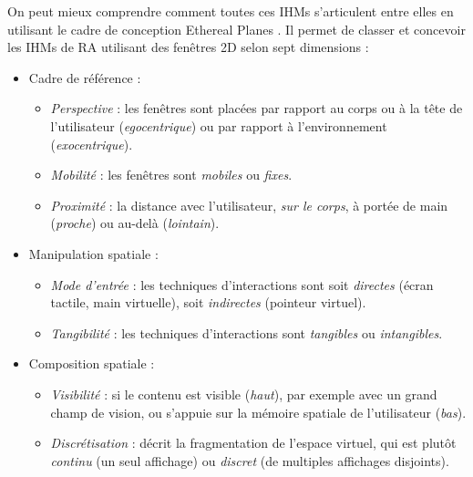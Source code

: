 On peut mieux comprendre comment toutes ces IHMs s'articulent entre elles en utilisant le cadre de conception Ethereal Planes \citep{Ens2014a}. Il permet de classer et concevoir les IHMs de RA utilisant des fenêtres 2D selon sept dimensions :
\begin{itemize}
  \item Cadre de référence :
  \begin{itemize}
    \item \emph{Perspective} : les fenêtres sont placées par rapport au corps ou à la tête de l'utilisateur (\emph{egocentrique}) ou par rapport à l'environnement (\emph{exocentrique}).
    \item \emph{Mobilité} : les fenêtres sont \emph{mobiles} ou \emph{fixes}.
    \item \emph{Proximité} : la distance avec l'utilisateur, \emph{sur le corps}, à portée de main (\emph{proche}) ou au-delà (\emph{lointain}).
  \end{itemize}
\end{itemize}
\newpage %
\begin{itemize}
  \item Manipulation spatiale :
  \begin{itemize}
    \item \emph{Mode d'entrée} : les techniques d'interactions sont soit \emph{directes} (écran tactile, main virtuelle), soit \emph{indirectes} (pointeur virtuel).
    \item \emph{Tangibilité} : les techniques d'interactions sont \emph{tangibles} ou \emph{intangibles}.
  \end{itemize}
  \item Composition spatiale :
  \begin{itemize}
    \item \emph{Visibilité} : si le contenu est visible (\emph{haut}), par exemple avec un grand champ de vision, ou s'appuie sur la mémoire spatiale de l'utilisateur (\emph{bas}).
    \item \emph{Discrétisation} : décrit la fragmentation de l'espace virtuel, qui est plutôt \emph{continu} (un seul affichage) ou \emph{discret} (de multiples affichages disjoints).
  \end{itemize}
\end{itemize}
\medskip

